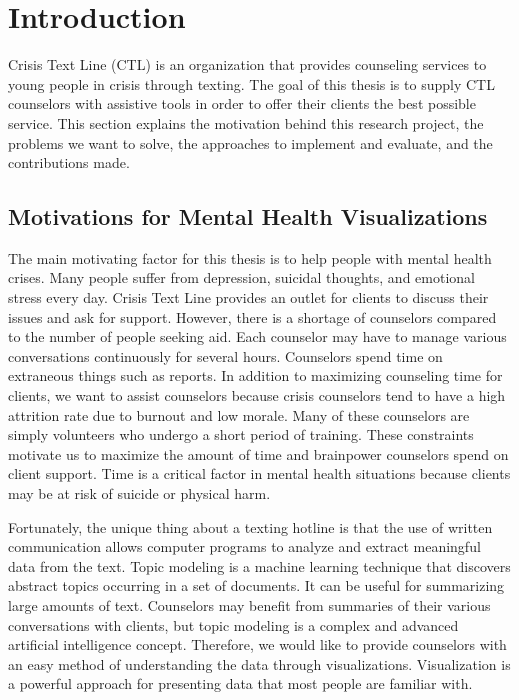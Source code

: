 \chapter{Introduction}

Crisis Text Line (CTL) is an organization that provides counseling services to young
people in crisis through texting. The goal of this thesis is to supply CTL counselors
with assistive tools in order to offer their clients the best possible service. This section
explains the motivation behind this research project, the problems we want to solve,
the approaches to implement and evaluate, and the contributions made.

\section{Motivations for Mental Health Visualizations}

The main motivating factor for this thesis is to help people with mental health crises.
Many people suffer from depression, suicidal thoughts, and emotional stress every
day. Crisis Text Line provides an outlet for clients to discuss their issues and ask
for support. However, there is a shortage of counselors compared to the
number of people seeking aid. Each counselor may have to manage various
conversations continuously for several hours. Counselors spend time on extraneous
things such as reports. In addition to maximizing counseling time for clients,
we want to assist counselors
because crisis counselors tend to have a high attrition rate due to burnout and low morale.
Many of these counselors are simply volunteers who undergo a short period of training.
These constraints motivate us to maximize the amount of time and brainpower counselors
spend on client support. Time is a critical factor in mental health situations
because clients may be at risk of suicide or physical harm.

Fortunately, the unique thing about a texting hotline is that the use of written
communication allows computer programs to analyze and extract meaningful data
from the text. Topic modeling is a machine learning technique that discovers abstract
topics occurring in a set of documents. It can be useful for summarizing large amounts
of text. Counselors may benefit from summaries of their various conversations with
clients, but topic modeling is a complex and advanced artificial intelligence concept.
Therefore, we would like to provide counselors with an easy method of understanding
the data through visualizations. Visualization is a powerful approach for presenting
data that most people are familiar with.

